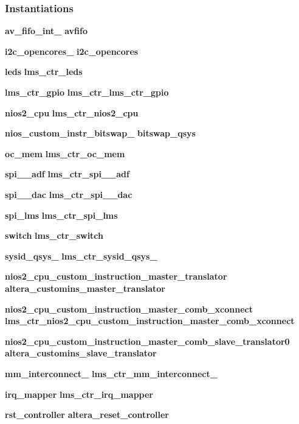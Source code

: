 \subsubsection*{Instantiations}
 \begin{DoxyCompactItemize}
\item 
{\bf av\+\_\+fifo\+\_\+int\+\_}  {\bfseries avfifo}   
\item 
{\bf i2c\+\_\+opencores\+\_}  {\bfseries i2c\+\_\+opencores}   
\item 
{\bf leds}  {\bfseries lms\+\_\+ctr\+\_\+leds}   
\item 
{\bf lms\+\_\+ctr\+\_\+gpio}  {\bfseries lms\+\_\+ctr\+\_\+lms\+\_\+ctr\+\_\+gpio}   
\item 
{\bf nios2\+\_\+cpu}  {\bfseries lms\+\_\+ctr\+\_\+nios2\+\_\+cpu}   
\item 
{\bf nios\+\_\+custom\+\_\+instr\+\_\+bitswap\+\_}  {\bfseries bitswap\+\_\+qsys}   
\item 
{\bf oc\+\_\+mem}  {\bfseries lms\+\_\+ctr\+\_\+oc\+\_\+mem}   
\item 
{\bf spi\+\_\+\_\+adf}  {\bfseries lms\+\_\+ctr\+\_\+spi\+\_\+\_\+adf}   
\item 
{\bf spi\+\_\+\_\+dac}  {\bfseries lms\+\_\+ctr\+\_\+spi\+\_\+\_\+dac}   
\item 
{\bf spi\+\_\+lms}  {\bfseries lms\+\_\+ctr\+\_\+spi\+\_\+lms}   
\item 
{\bf switch}  {\bfseries lms\+\_\+ctr\+\_\+switch}   
\item 
{\bf sysid\+\_\+qsys\+\_}  {\bfseries lms\+\_\+ctr\+\_\+sysid\+\_\+qsys\+\_}   
\item 
{\bf nios2\+\_\+cpu\+\_\+custom\+\_\+instruction\+\_\+master\+\_\+translator}  {\bfseries altera\+\_\+customins\+\_\+master\+\_\+translator}   
\item 
{\bf nios2\+\_\+cpu\+\_\+custom\+\_\+instruction\+\_\+master\+\_\+comb\+\_\+xconnect}  {\bfseries lms\+\_\+ctr\+\_\+nios2\+\_\+cpu\+\_\+custom\+\_\+instruction\+\_\+master\+\_\+comb\+\_\+xconnect}   
\item 
{\bf nios2\+\_\+cpu\+\_\+custom\+\_\+instruction\+\_\+master\+\_\+comb\+\_\+slave\+\_\+translator0}  {\bfseries altera\+\_\+customins\+\_\+slave\+\_\+translator}   
\item 
{\bf mm\+\_\+interconnect\+\_}  {\bfseries lms\+\_\+ctr\+\_\+mm\+\_\+interconnect\+\_}   
\item 
{\bf irq\+\_\+mapper}  {\bfseries lms\+\_\+ctr\+\_\+irq\+\_\+mapper}   
\item 
{\bf rst\+\_\+controller}  {\bfseries altera\+\_\+reset\+\_\+controller}   
\end{DoxyCompactItemize}


